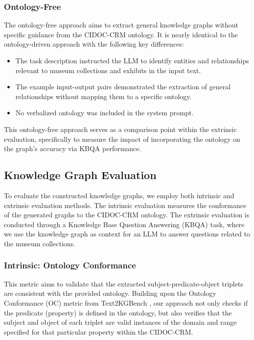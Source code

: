 \documentclass[a4, conference]{IEEEtran}
\begin{document}
\subsubsection{Ontology-Free}

The ontology-free approach aims to extract general knowledge graphs without specific guidance from the CIDOC-CRM ontology. It is nearly identical to the ontology-driven approach with the following key differences:

\begin{itemize}
    \item The task description instructed the LLM to identify entities and relationships relevant to museum collections and exhibits in the input text.
    \item The example input-output pairs demonstrated the extraction of general relationships without mapping them to a specific ontology.
    \item No verbalized ontology was included in the system prompt.
\end{itemize}

This ontology-free approach serves as a comparison point within the extrinsic evaluation, specifically to measure the impact of incorporating the ontology on the graph's accuracy via KBQA performance.

\subsection{Knowledge Graph Evaluation}

To evaluate the constructed knowledge graphs, we employ both intrinsic and extrinsic evaluation methods. The intrinsic evaluation measures the conformance of the generated graphs to the CIDOC-CRM ontology. The extrinsic evaluation is conducted through a Knowledge Base Question Answering (KBQA) task, where we use the knowledge graph as context for an LLM to answer questions related to the museum collections.

\subsubsection{Intrinsic: Ontology Conformance}

This metric aims to validate that the extracted subject-predicate-object triplets are consistent with the provided ontology. Building upon the Ontology Conformance (OC) metric from Text2KGBench \cite{mihindukulasooriya2023text2kgbench}, our approach not only checks if the predicate (property) is defined in the ontology, but also verifies that the subject and object of each triplet are valid instances of the domain and range specified for that particular property within the CIDOC-CRM.
\end{document}
